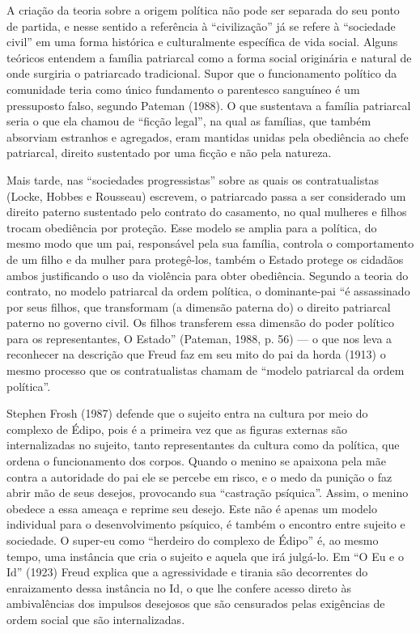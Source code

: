 A criação da teoria sobre a origem política não pode ser separada do seu
ponto de partida, e nesse sentido a referência à ``civilização'' já se
refere à ``sociedade civil'' em uma forma histórica e culturalmente
específica de vida social. Alguns teóricos entendem a família patriarcal
como a forma social originária e natural de onde surgiria o patriarcado
tradicional. Supor que o funcionamento político da comunidade teria como
único fundamento o parentesco sanguíneo é um pressuposto falso, segundo
Pateman (1988). O que sustentava a família patriarcal seria o que ela
chamou de ``ficção legal'', na qual as famílias, que também absorviam
estranhos e agregados, eram mantidas unidas pela obediência ao chefe
patriarcal, direito sustentado por uma ficção e não pela natureza.

Mais tarde, nas ``sociedades progressistas'' sobre as quais os
contratualistas (Locke, Hobbes e Rousseau) escrevem, o patriarcado passa
a ser considerado um direito paterno sustentado pelo contrato do
casamento, no qual mulheres e filhos trocam obediência por proteção.
Esse modelo se amplia para a política, do mesmo modo que um pai,
responsável pela sua família, controla o comportamento de um filho e da
mulher para protegê-los, também o Estado protege os cidadãos ambos
justificando o uso da violência para obter obediência. Segundo a teoria
do contrato, no modelo patriarcal da ordem política, o dominante-pai ``é
assassinado por seus filhos, que transformam (a dimensão paterna do) o
direito patriarcal paterno no governo civil. Os filhos transferem essa
dimensão do poder político para os representantes, O Estado'' (Pateman,
1988, p. 56) --- o que nos leva a reconhecer na descrição que Freud faz
em seu mito do pai da horda (1913) o mesmo processo que os
contratualistas chamam de ``modelo patriarcal da ordem política''.

Stephen Frosh (1987) defende que o sujeito entra na cultura por meio do
complexo de Édipo, pois é a primeira vez que as figuras externas são
internalizadas no sujeito, tanto representantes da cultura como da
política, que ordena o funcionamento dos corpos. Quando o menino se
apaixona pela mãe contra a autoridade do pai ele se percebe em risco, e
o medo da punição o faz abrir mão de seus desejos, provocando sua
``castração psíquica''. Assim, o menino obedece a essa ameaça e reprime
seu desejo. Este não é apenas um modelo individual para o
desenvolvimento psíquico, é também o encontro entre sujeito e sociedade.
O super-eu como ``herdeiro do complexo de Édipo'' é, ao mesmo tempo, uma
instância que cria o sujeito e aquela que irá julgá-lo. Em ``O Eu e o Id''
(1923) Freud explica que a agressividade e tirania são decorrentes do
enraizamento dessa instância no Id, o que lhe confere acesso direto às
ambivalências dos impulsos desejosos que são censurados pelas exigências
de ordem social que são internalizadas.

